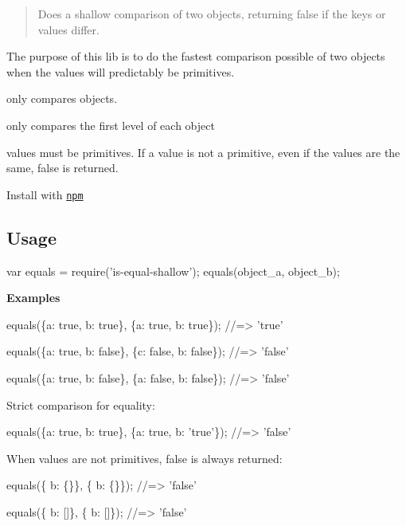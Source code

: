 \begin{quote}
Does a shallow comparison of two objects, returning false if the keys or values differ. \end{quote}


The purpose of this lib is to do the fastest comparison possible of two objects when the values will predictably be primitives.


\begin{DoxyItemize}
\item only compares objects.
\item only compares the first level of each object
\item values must be primitives. If a value is not a primitive, even if the values are the same, {\ttfamily false} is returned.
\end{DoxyItemize}

Install with \href{https://www.npmjs.com/}{\tt npm}




\subsection*{Usage}


\begin{DoxyCode}
var equals = require('is-equal-shallow');
equals(object\_a, object\_b);
\end{DoxyCode}


{\bfseries Examples}


\begin{DoxyCode}
equals(\{a: true, b: true\}, \{a: true, b: true\});
//=> 'true'

equals(\{a: true, b: false\}, \{c: false, b: false\});
//=> 'false'

equals(\{a: true, b: false\}, \{a: false, b: false\});
//=> 'false'
\end{DoxyCode}


Strict comparison for equality\+:


\begin{DoxyCode}
equals(\{a: true, b: true\}, \{a: true, b: 'true'\});
//=> 'false'
\end{DoxyCode}


When values are not primitives, {\ttfamily false} is always returned\+:


\begin{DoxyCode}
equals(\{ b: \{\}\}, \{ b: \{\}\});
//=> 'false'

equals(\{ b: []\}, \{ b: []\});
//=> 'false'
\end{DoxyCode}


